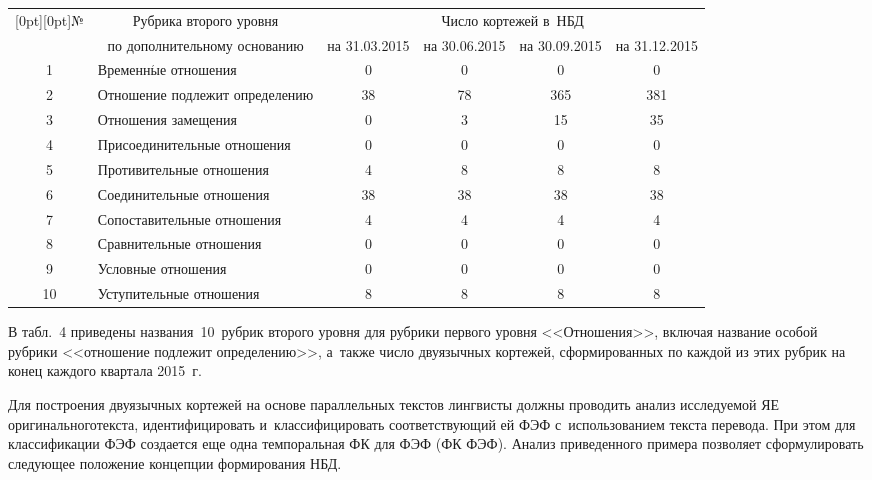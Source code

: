 \begin{multicols}{2}
\begin{table*}[b]
\begin{center}
  \begin{tabular}{|c|l|c|c|c|c|}
  \hline
\multicolumn{1}{|c|}{\raisebox{-6pt}[0pt][0pt]{№}}&\multicolumn{1}{c|}{Рубрика второго уровня} & \multicolumn{4}{c|}{Число кортежей в~НБД}\\
\cline{3-6}
&\multicolumn{1}{c|}{по дополнительному основанию}&
на 31.03.2015&
на 30.06.2015&
 на  30.09.2015&
на 31.12.2015\\
\hline
1&Временн$\acute{\mbox{ы}}$е отношения&0&0&0&\hphantom{9}0\\
2&Отношение подлежит определению&38\hphantom{9}&78\hphantom{9}&365\hphantom{99}&381\hphantom{9}\\
3&Отношения замещения&0&3&15\hphantom{9}&35\\
4&Присоединительные отношения&0&0&0&\hphantom{9}0\\
5&Противительные отношения&4&8&8&\hphantom{9}8\\
6&Соединительные отношения&38\hphantom{9}&38\hphantom{9}&38\hphantom{9}&38\\
7&Сопоставительные отношения&4&4&4&\hphantom{9}4\\
8&Сравнительные отношения&0&0&0&\hphantom{9}0\\
9&Условные отношения&0&0&0&\hphantom{9}0\\
10\hphantom{9}&Уступительные отношения&8&8&8&\hphantom{9}8\\
\hline
\end{tabular}
\end{center}
\end{table*}


  

  В табл.~4 приведены названия~10~рубрик вто\-рого уровня для рубрики 
первого уровня <<Отно\-шения>>, включая название особой рубрики 
<<отношение подлежит определению>>, а~так\-же число двуязыч\-ных 
кортежей, сформированных по каждой из этих рубрик на конец каждого 
квартала 2015~г.
  

  Для построения двуязычных кортежей на основе параллельных текстов 
лингвисты должны про\-водить анализ исследуемой ЯЕ
оригиналь\-ного\linebreak текс\-та, идентифицировать и~классифицировать 
соответствующий ей ФЭФ с~использованием текста
 перевода. При этом для 
классификации ФЭФ создается еще одна темпоральная ФК для ФЭФ (ФК 
ФЭФ). Анализ приведенного примера позволяет сформулировать следующее 
положение концепции формирования НБД.


  
  \smallskip
  

\end{multicols}
